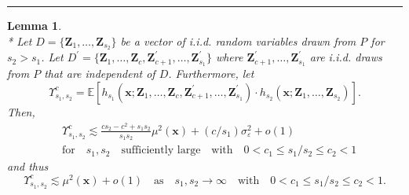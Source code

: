 \documentclass[letterpaper,10pt]{article}
\numberwithin{equation}{section}
\numberwithin{thm}{section}
\newtheorem{lem}{Lemma}
\numberwithin{lem}{section}
\numberwithin{cor}{section}
\newcommand{\E}{\mathbb{E}}
\newcommand{\1}{\mathbbm{1}}
\begin{document}
\hrule

\begin{lem}\label{lem_upsilon_sc}\mbox{}\\*
	Let $D = \{\mathbf{Z}_1, \dotsc, \mathbf{Z}_{s_2}\}$ be a vector of i.i.d. random variables drawn from $P$ for $s_2 > s_1$.
	Let $D^{\prime} = \{\mathbf{Z}_1, \dotsc, \mathbf{Z}_{c}, \mathbf{Z}_{c+1}^{\prime}, \dotsc,  \mathbf{Z}_{s_1}^{\prime}\}$ where $\mathbf{Z}_{c+1}^{\prime}, \dotsc,  \mathbf{Z}_{s_1}^{\prime}$ are i.i.d. draws from $P$ that are independent of $D$.
	Furthermore, let
	\begin{equation}
		\Upsilon_{s_1, s_2}^{c}
		= \E\left[h_{s_1}\left(\mathbf{x}; \mathbf{Z}_1, \ldots, \mathbf{Z}_c, \mathbf{Z}^{\prime}_{c+1}, \ldots,  \mathbf{Z}^{\prime}_{s_1}\right) \cdot
			h_{s_2}\left(\mathbf{x}; \mathbf{Z}_1, \ldots, \mathbf{Z}_{s_2}\right)\right].
	\end{equation}
	Then,
	\begin{equation}
		\begin{aligned}
			 & \Upsilon_{s_1, s_2}^{c}
			\lesssim \frac{c s_2 - c^2 + s_1 s_2}{s_1 s_2}\mu^2(\mathbf{x}) + (c/s_1) \sigma^2_{\varepsilon} + o(1) \\
			 & \text{for} \quad s_1, s_2 \quad \text{sufficiently large}
			\quad \text{with} \quad
			0 < c_1 \leq s_1 / s_2 \leq c_2 < 1
		\end{aligned}
	\end{equation}
	and thus
	\begin{equation}
		\Upsilon_{s_1, s_2}^{c}
		\lesssim \mu^2(\mathbf{x}) + o(1)
		\quad \text{as} \quad s_1, s_2 \rightarrow \infty
		\quad \text{with} \quad
		0 < c_1 \leq s_1 / s_2 \leq c_2 < 1.
	\end{equation}
\end{lem}
\end{document}
